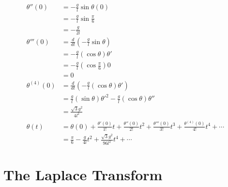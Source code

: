 \documentclass{article}
\begin{document}
\begin{align*}
  \theta''(0)     & = -\frac{g}{l} \sin \theta(0)                                                                                                              \\
                  & = -\frac{g}{l} \sin \frac{\pi}{6}                                                                                                          \\
                  & = -\frac{g}{2 l}                                                                                                                           \\
  \theta'''(0)    & = \frac{d}{dt} \left( -\frac{g}{l} \sin \theta \right)                                                                                     \\
                  & = -\frac{g}{l} (\cos \theta) \theta'                                                                                                       \\
                  & = -\frac{g}{l} (\cos \frac{\pi}{6}) 0                                                                                                      \\
                  & = 0                                                                                                                                        \\
  \theta^{(4)}(0) & = \frac{d}{dt} \left( -\frac{g}{l} (\cos \theta) \theta' \right)                                                                           \\
                  & = \frac{g}{l} (\sin \theta) \theta'^2 - \frac{g}{l} (\cos \theta) \theta''                                                                 \\
                  & = \frac{\sqrt{3} g^2}{4 l^2}                                                                                                               \\
  \theta(t)       & = \theta(0) + \frac{\theta'(0)}{1!} t + \frac{\theta''(0)}{2!} t^2 + \frac{\theta'''(0)}{3!} t^3 + \frac{\theta^{(4)}(0)}{4!} t^4 + \cdots \\
                  & = \frac{\pi}{6} - \frac{g}{4 l} t^2 + \frac{\sqrt{3} g^2}{96 l^2} t^4 + \cdots
\end{align*}

\section{The Laplace Transform}
\end{document}
